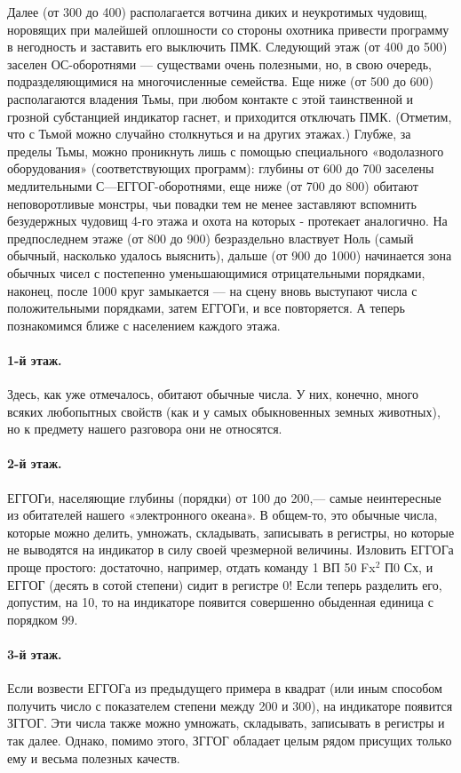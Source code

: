 \documentclass[11pt,a4paper,oneside]{article}
\begin{document}
Далее (от 300 до 400) располагается вотчина диких и неукротимых чудовищ, норовящих при малейшей оплошности со стороны охотника привести программу в негодность и заставить его выключить ПМК. Следующий этаж (от 400 до 500) заселен ОС-оборотнями — существами очень полезными, но, в свою очередь, подразделяющимися на многочисленные семейства. Еще ниже (от 500 до 600) располагаются владения Тьмы, при любом контакте с этой таинственной и грозной субстанцией индикатор гаснет, и приходится отключать ПМК. (Отметим, что с Тьмой можно случайно столкнуться и на других этажах.) Глубже, за пределы Тьмы, можно проникнуть лишь с помощью специального «водолазного оборудования» (соответствующих программ): глубины от 600 до 700 заселены медлительными С—ЕГГОГ-оборотнями, еще ниже (от 700 до 800) обитают неповоротливые монстры, чьи повадки тем не менее заставляют вспомнить безудержных чудовищ 4-го этажа и охота на которых - протекает аналогично. На предпоследнем этаже (от 800 до 900) безраздельно властвует Ноль (самый обычный, насколько удалось выяснить), дальше (от 900 до 1000) начинается зона обычных чисел с постепенно уменьшающимися отрицательными порядками, наконец, после 1000 круг замыкается — на сцену вновь выступают числа с положительными порядками, затем ЕГГОГи, и все повторяется. А теперь познакомимся ближе с населением каждого этажа.

\paragraph{1-й этаж.} Здесь, как уже отмечалось, обитают обычные числа. У них, конечно, много всяких любопытных свойств (как и у самых обыкновенных земных животных), но к предмету нашего разговора они не относятся.
\paragraph{2-й этаж.} ЕГГОГи, населяющие глубины (порядки) от 100 до 200,— самые неинтересные из обитателей нашего «электронного океана». В общем-то, это обычные числа, которые можно делить, умножать, складывать, записывать в регистры, но которые не выводятся на индикатор в силу своей чрезмерной величины. Изловить ЕГГОГа проще простого: достаточно, например, отдать команду 1 ВП 50 Fx$^{2}$ П0 Сх, и ЕГГОГ (десять в сотой степени) сидит в регистре 0! Если теперь разделить его, допустим, на 10, то на индикаторе появится совершенно обыденная единица с порядком 99.
\paragraph{3-й этаж.} Если возвести ЕГГОГа из предыдущего примера в квадрат (или иным способом получить число с показателем степени между 200 и 300), на индикаторе появится ЗГГОГ. Эти числа также можно умножать, складывать, записывать в регистры и так далее. Однако, помимо этого, ЗГГОГ обладает целым рядом присущих только ему и весьма полезных качеств.
\end{document}
